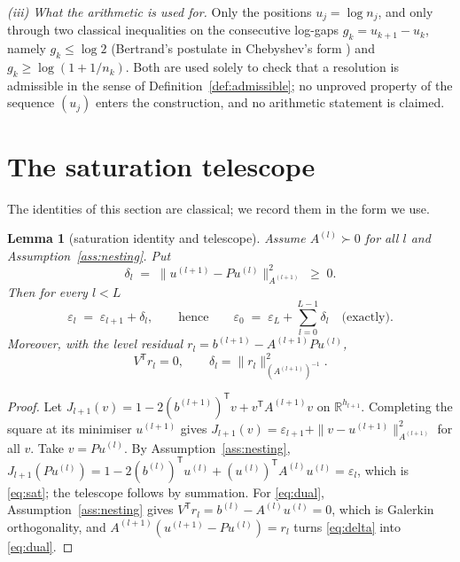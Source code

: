 \documentclass[11pt,a4paper]{article}
\theoremstyle{plain}
\newtheorem{lemma}[theorem]{Lemma}
\theoremstyle{definition}
\newcommand{\R}{\mathbb{R}}
\newcommand{\T}{\mathsf{T}}
\newcommand{\PD}{\succ 0}
\begin{document}
\emph{(iii) What the arithmetic is used for.} Only the positions $u_{j}=\log n_{j}$,
and only through two classical inequalities on the consecutive log-gaps
$g_{k}=u_{k+1}-u_{k}$, namely $g_{k}\le\log 2$ (Bertrand's postulate in Chebyshev's
form \cite{Chebyshev1852}) and $g_{k}\ge\log(1+1/n_{k})$. Both are used solely to
check that a resolution is admissible in the sense of
Definition~\ref{def:admissible}; no unproved property of the sequence
$(u_{j})$ enters the construction, and no arithmetic statement is claimed.

\section{The saturation telescope}
\label{sec:telescope}

The identities of this section are classical; we record them in the form we use.

\begin{lemma}[saturation identity and telescope]
\label{lem:telescope}
Assume $A^{(l)}\PD$ for all $l$ and Assumption~\ref{ass:nesting}. Put
\begin{equation}
\label{eq:delta}
  \delta_{l}\;=\;\bigl\|u^{(l+1)}-Pu^{(l)}\bigr\|_{A^{(l+1)}}^{2}\;\ge\;0 .
\end{equation}
Then for every $l<L$
\begin{equation}
\label{eq:sat}
  \varepsilon_{l}\;=\;\varepsilon_{l+1}+\delta_{l},
  \qquad\text{hence}\qquad
  \varepsilon_{0}\;=\;\varepsilon_{L}+\sum_{l=0}^{L-1}\delta_{l}
  \quad\text{(exactly)} .
\end{equation}
Moreover, with the level residual $r_{l}=b^{(l+1)}-A^{(l+1)}Pu^{(l)}$,
\begin{equation}
\label{eq:dual}
  V^{\T}r_{l}=0,
  \qquad
  \delta_{l}=\bigl\|r_{l}\bigr\|^{2}_{(A^{(l+1)})^{-1}} .
\end{equation}
\end{lemma}

\begin{proof}
Let $J_{l+1}(v)=1-2(b^{(l+1)})^{\T}v+v^{\T}A^{(l+1)}v$ on $\R^{h_{l+1}}$. Completing
the square at its minimiser $u^{(l+1)}$ gives
$J_{l+1}(v)=\varepsilon_{l+1}+\|v-u^{(l+1)}\|^{2}_{A^{(l+1)}}$ for all $v$. Take
$v=Pu^{(l)}$. By Assumption~\ref{ass:nesting},
$J_{l+1}(Pu^{(l)})=1-2(b^{(l)})^{\T}u^{(l)}+(u^{(l)})^{\T}A^{(l)}u^{(l)}
=\varepsilon_{l}$, which is \eqref{eq:sat}; the telescope follows by summation. For
\eqref{eq:dual}, Assumption~\ref{ass:nesting} gives
$V^{\T}r_{l}=b^{(l)}-A^{(l)}u^{(l)}=0$, which is Galerkin orthogonality, and
$A^{(l+1)}(u^{(l+1)}-Pu^{(l)})=r_{l}$ turns \eqref{eq:delta} into \eqref{eq:dual}.
\end{proof}
\end{document}
